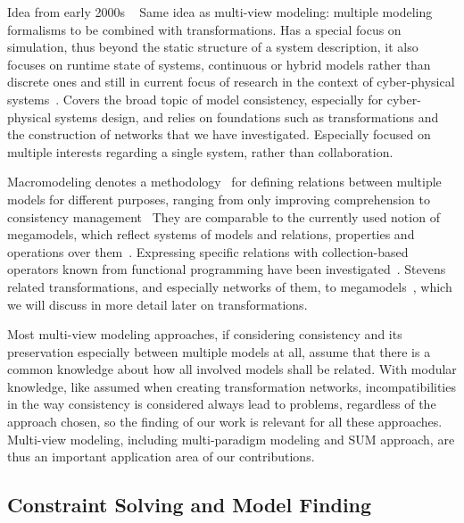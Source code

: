 Idea from early 2000s ~\cite{vangheluwe2002mpm-AIS, vangheluwe2003mpm-WSC}
Same idea as multi-view modeling: multiple modeling formalisms to be combined with transformations. Has a special focus on simulation, thus beyond the static structure of a system description, it also focuses on runtime state of systems, continuous or hybrid models rather than discrete ones and still in current focus of research in the context of cyber-physical systems~\cite{carreira2020mpm4cpsfoundations}.
Covers the broad topic of model consistency, especially for cyber-physical systems design, and relies on foundations such as transformations and the construction of networks that we have investigated.
Especially focused on multiple interests regarding a single system, rather than collaboration.

Macromodeling denotes a methodology~\cite{salay2012macromodelingMethodoloy-MODELS} for defining relations between multiple models for different purposes, ranging from only improving comprehension to consistency management~\cite{salay2008macromodeling-ASE,salay2009macromodels-CAiSE}
They are comparable to the currently used notion of megamodels, which reflect systems of models and relations, properties and operations over them~\cite{diskin2013megamodeling-SLE}.
Expressing specific relations with collection-based operators known from functional programming have been investigated~\cite{salay2015megamodeling-MODELS, salay2020megamodeling-SoSym}.
Stevens related transformations, and especially networks of them, to megamodels~\cite{stevens2020BuildingFromMegamodels-SoSym}, which we will discuss in more detail later on transformations.

Most multi-view modeling approaches, if considering consistency and its preservation especially between multiple models at all, assume that there is a common knowledge about how all involved models shall be related.
With modular knowledge, like assumed when creating transformation networks, incompatibilities in the way consistency is considered always lead to problems, regardless of the approach chosen, so the finding of our work is relevant for all these approaches. Multi-view modeling, including multi-paradigm modeling and \gls{SUM} approach, are thus an important application area of our contributions.


\subsection{Constraint Solving and Model Finding}

